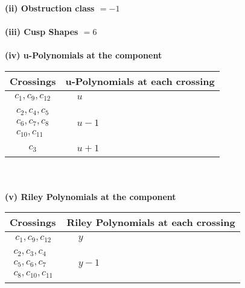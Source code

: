 \documentclass[1p]{elsarticle_modified}
\theoremstyle{definition}
\begin{document}
\flushleft \textbf{(ii) Obstruction class $= -1$}\\~\\
\flushleft \textbf{(iii) Cusp Shapes $= 6$}\\~\\
\newpage\renewcommand{\arraystretch}{1}
\flushleft \textbf{(iv) u-Polynomials at the component}\newline \\
\begin{tabular}{m{50pt}|m{274pt}}
Crossings & \hspace{64pt}u-Polynomials at each crossing \\
\hline $$\begin{aligned}c_{1},c_{9},c_{12}\end{aligned}$$&$\begin{aligned}
&u
\end{aligned}$\\
\hline $$\begin{aligned}c_{2},c_{4},c_{5}\\c_{6},c_{7},c_{8}\\c_{10},c_{11}\end{aligned}$$&$\begin{aligned}
&u-1
\end{aligned}$\\
\hline $$\begin{aligned}c_{3}\end{aligned}$$&$\begin{aligned}
&u+1
\end{aligned}$\\
\hline
\end{tabular}\\~\\
\newpage\renewcommand{\arraystretch}{1}
\flushleft \textbf{(v) Riley Polynomials at the component}\newline \\
\begin{tabular}{m{50pt}|m{274pt}}
Crossings & \hspace{64pt}Riley Polynomials at each crossing \\
\hline $$\begin{aligned}c_{1},c_{9},c_{12}\end{aligned}$$&$\begin{aligned}
&y
\end{aligned}$\\
\hline $$\begin{aligned}c_{2},c_{3},c_{4}\\c_{5},c_{6},c_{7}\\c_{8},c_{10},c_{11}\end{aligned}$$&$\begin{aligned}
&y-1
\end{aligned}$\\
\hline
\end{tabular}\\~\\
\end{document}
